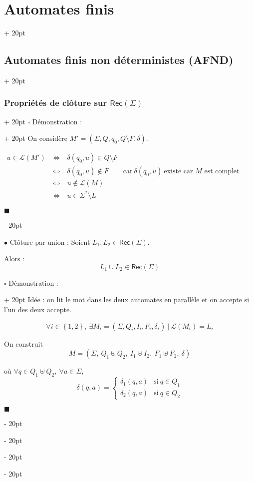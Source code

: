 \documentclass[a4paper, 12pt, twoside]{article}
\newcommand{\lr}[1]{\left( #1 \right)}
\newcommand{\set}[1]{\left\{ #1 \right\}}
\newcommand{\ssi}{\ \Leftrightarrow \ }
\newcommand{\ind}[1][20pt]{\advance\leftskip + #1}
\newcommand{\deind}[1][20pt]{\advance\leftskip - #1}
\newenvironment{indt}[2][20pt]{#2 \par \ind[#1]}{\par \deind} %
\newenvironment{proof}[1][{Démonstration :}]{\begin{indt}{$\square$ #1}}{$\blacksquare$ \end{indt}}
\newcommand{\Rec}[1]{\mathsf{Rec}\!\lr{#1}}
\begin{document}
\begin{indt}{\section{Automates finis}}
\begin{indt}{\subsection{Automates finis non déterministes (AFND)}}
\begin{indt}{\subsubsection{Propriétés de clôture sur $\Rec \Sigma$}}
\begin{proof}
                    On considère $M' = (\Sigma, Q, q_0, Q \setminus F, \delta)$.

                    \(
                        \begin{array}{rcll}
                            u \in \mathcal L(M')
                            &\ssi& \delta(q_0, u) \in Q \setminus F
                            \\
                            &\ssi& \delta(q_0, u) \notin F
                            & \text{car}\ \delta(q_0, u)\  \text{existe car $M$ est complet}
                            \\
                            &\ssi& u \notin \mathcal L(M)
                            \\
                            &\ssi& u \in \Sigma^* \setminus L
                        \end{array}
                    \)

                \end{proof}

                \vspace{12pt}
                
                $\bullet$ Clôture par union : Soient $L_1, L_2 \in \Rec \Sigma$.

                Alors :
                \[
                    L_1 \cup L_2 \in \Rec \Sigma
                \]

                \begin{proof}
                    Idée : on lit le mot dans les deux automates en parallèle et on accepte si l'un des deux accepte.

                    \[
                        \forall i \in \set{1, 2},\ \exists M_i = (\Sigma, Q_i, I_i, F_i, \delta_i)\ |\ \mathcal L(M_i) = L_i
                    \]

                    On construit
                    \[
                        M = \lr{\Sigma,\ Q_1 \uplus Q_2,\ I_1 \uplus I_2,\ F_1 \uplus F_2,\ \delta}
                    \]

                    où $\forall q \in Q_1 \uplus Q_2,\ \forall a \in \Sigma,$
                    \[
                        \delta(q, a) =
                        \begin{cases}
                            \delta_1(q, a)
                            & \text{si}\ q \in Q_1
                            \\
                            \delta_2(q, a)
                            & \text{si}\ q \in Q_2
                        \end{cases}
                    \]


\end{proof}
\end{indt}
\end{indt}
\end{indt}
\end{document}
